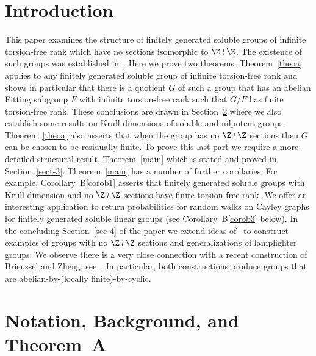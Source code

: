 \section{Introduction}

This paper examines the structure of finitely generated soluble groups of infinite torsion-free rank which have no sections isomorphic to $\Z\wr\Z$. The existence of such groups was established in~\cite{K2}. Here we prove two theorems. Theorem~\ref{theoa} applies to any finitely generated soluble group of infinite torsion-free rank and shows in particular that there is a quotient $G$ of such a group that has an abelian Fitting subgroup $F$ with infinite torsion-free rank such that $G/F$ has finite torsion-free rank. These conclusions are drawn in Section~\ref{sec-2} where we also establish some results on Krull dimensions of soluble and nilpotent groups. Theorem~\ref{theoa} also asserts that when the group has no $\Z\wr\Z$ sections then $G$ can be chosen to be residually finite. To prove this last part we require a more detailed structural result, Theorem~\ref{main} which is stated and proved in Section~\ref{sect-3}. Theorem~\ref{main} has a number of further corollaries. For example, Corollary~B\ref{corob1} asserts that finitely generated soluble groups with Krull dimension and no $\Z\wr\Z$ sections have finite torsion-free rank. We offer an interesting application to return probabilities for random walks on Cayley graphs for finitely generated soluble linear groups (see Corollary~B\ref{corob3} below). In the concluding Section~\ref{sec-4} of the paper we extend ideas of~\cite{K2} to construct examples of groups with no $\Z\wr\Z$ sections and generalizations of lamplighter groups. We observe there is a very close connection with a recent construction of Brieussel and Zheng, see~\cite{Brieussel,BZ}. In particular, both constructions produce groups that are abelian-by-(locally finite)-by-cyclic.



\section{Notation, Background, and Theorem~A}\label{sec-2}

